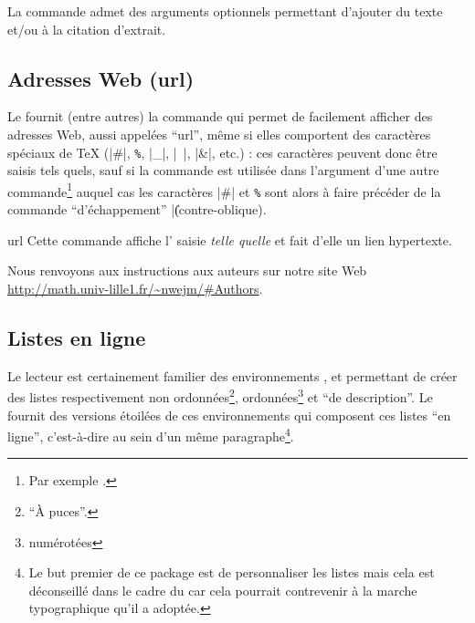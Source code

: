 La commande  admet des arguments optionnels permettant
d'ajouter du texte  et/ou  à la citation
d'extrait\autocite[Pour plus de détails, cf. par exemple][]{Bitouze}.


\subsection{Adresses Web (\texorpdfstring{\acrshort{url}}{URL})}
\label{sec-url}

Le  fournit (entre autres) la commande  qui
permet de facilement afficher des adresses Web, aussi appelées
\enquote{\gls{url}}, même si elles comportent des caractères spéciaux de \TeX{}
(|#|,
%
\lstinline[commentstyle={}]+%+,
%
|_|, |~|, |&|, etc.) : ces caractères peuvent donc être saisis tels quels, sauf
si la commande  est utilisée dans l'argument d'une autre
commande\footnote{Par exemple \protect{}.} auquel cas les
caractères |#| et
%
\lstinline[commentstyle={}]+%+
%
sont alors à faire précéder de la commande \enquote{d'échappement} |\|
(contre-oblique).%

\begin{docCommand}{url}{}
  Cette commande affiche l' saisie \emph{telle quelle} et fait
  d'elle un lien hypertexte.
\begin{bodycode}[listing and text,listing options={deletekeywords={url,math,nwejm,exemple,pdf}}]
Nous renvoyons aux instructions aux auteurs sur notre site Web
\url{http://math.univ-lille1.fr/~nwejm/#Authors}.
\end{bodycode}
\end{docCommand}

\subsection{Listes en ligne}
\label{sec:listes-en-ligne}

Le lecteur est certainement familier des environnements
,  et
 permettant de créer des listes respectivement
non ordonnées\footnote{\enquote{À puces}.}, ordonnées\footnote{\Ie*{}
  numérotées} et \enquote{de description}. Le  fournit des
versions étoilées de ces environnements qui composent ces listes \enquote{en
  ligne}, c'est-à-dire au sein d'un même paragraphe\footnote{Le but premier de
  ce package est de personnaliser les listes mais cela est déconseillé dans le
  cadre du \nwejm{} car cela pourrait contrevenir à la marche typographique
  qu'il a adoptée.}.

